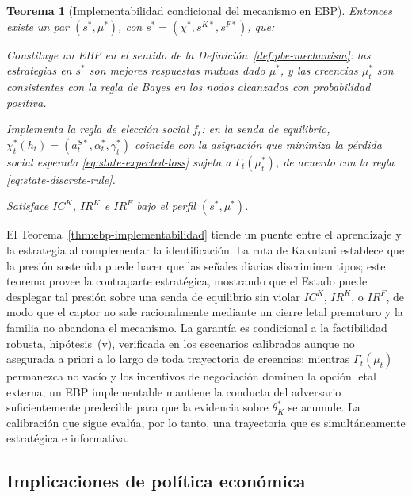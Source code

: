 \documentclass[pdflatex,sn-mathphys-ay]{sn-jnl}
\theoremstyle{thmstyleone}
\newtheorem{theorem}{Teorema}
\theoremstyle{thmstyletwo}
\theoremstyle{thmstylethree}
\newcommand{\1}{\mathbf{1}}
\begin{document}
\begin{theorem}[Implementabilidad condicional del mecanismo en EBP]
Entonces existe un par $(s^\ast,\mu^\ast)$, con $s^\ast=({\chi}^\ast,s^{K\ast},s^{F\ast})$, que:
\begin{list}{}{\setlength{\labelwidth}{2.0em}\setlength{\labelsep}{0.7em}\setlength{\leftmargin}{2.7em}\setlength{\itemindent}{0pt}\setlength{\listparindent}{0pt}\setlength{\parsep}{0pt}\setlength{\itemsep}{0.25\baselineskip}}
    \item[\textup{(a)}] Constituye un EBP en el sentido de la Definición~\ref{def:pbe-mechanism}: las estrategias en $s^\ast$ son mejores respuestas mutuas dado $\mu^\ast$, y las creencias $\mu_t^\ast$ son consistentes con la regla de Bayes en los nodos alcanzados con probabilidad positiva.
    \item[\textup{(b)}] Implementa la regla de elección social $f_t$: en la senda de equilibrio, $\chi_t^\ast(h_t)=(a_t^{S\ast},\alpha_t^\ast,\gamma_t^\ast)$ coincide con la asignación que minimiza la pérdida social esperada \eqref{eq:state-expected-loss} sujeta a $\Gamma_t(\mu_t^\ast)$, de acuerdo con la regla \eqref{eq:state-discrete-rule}.
    \item[\textup{(c)}] Satisface $IC^K$, $IR^K$ e $IR^F$ bajo el perfil $(s^\ast,\mu^\ast)$.
\end{list}
\end{theorem}

\noindent El Teorema~\ref{thm:ebp-implementabilidad} tiende un puente entre el aprendizaje y la estrategia al complementar la identificación. La ruta de Kakutani establece que la presión sostenida puede hacer que las señales diarias discriminen tipos; este teorema provee la contraparte estratégica, mostrando que el Estado puede desplegar tal presión sobre una senda de equilibrio sin violar $IC^K$, $IR^K$, o $IR^F$, de modo que el captor no sale racionalmente mediante un cierre letal prematuro y la familia no abandona el mecanismo. La garantía es condicional a la factibilidad robusta, hipótesis~(v), verificada en los escenarios calibrados aunque no asegurada a priori a lo largo de toda trayectoria de creencias: mientras $\Gamma_t(\mu_t)$ permanezca no vacío y los incentivos de negociación dominen la opción letal externa, un EBP implementable mantiene la conducta del adversario suficientemente predecible para que la evidencia sobre $\theta_K^\ast$ se acumule. La calibración que sigue evalúa, por lo tanto, una trayectoria que es simultáneamente estratégica e informativa.

\subsection{Implicaciones de política económica}\label{subsec:implicaciones-politica}
\end{document}
